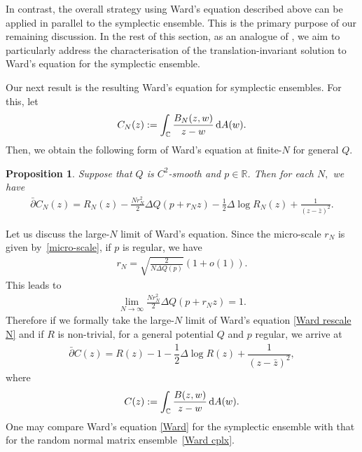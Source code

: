 \documentclass[pdftex]{sigma}
\numberwithin{equation}{section}
\newtheorem{Proposition}[Theorem]{Proposition}
 { \theoremstyle{definition}
\newtheorem{Definition}[Theorem]{Definition}
\newtheorem{Example}[Theorem]{Example}
\newtheorem{Remark}[Theorem]{Remark} }
\newcommand{\R}{{\mathbb R}}
\newcommand{\C}{{\mathbb C}}
\newcommand{\1}{\chi}
\begin{document}
\begin{Remark}
In contrast, the overall strategy using Ward's equation described above can be applied in parallel to the symplectic ensemble.
This is the primary purpose of our remaining discussion.
In the rest of this section, as an analogue of \cite{MR4030288}, we aim to particularly address the characterisation of the translation-invariant solution to Ward's equation for the symplectic ensemble.
\end{Remark}

Our next result is the resulting Ward's equation for symplectic ensembles. For this, let
\begin{gather*}
C_N(z):=\int_{ \C }\frac{B_N(z,w)}{z-w}\, {\rm d}A(w).
\end{gather*}
Then, we obtain the following form of Ward's equation at finite-$N$ for general $Q$.

\begin{Proposition} \label{Thm_Ward N}
	Suppose that $Q$ is $C^2$-smooth and $p \in \R$.
	Then for each $N,$ we have
	\begin{gather}		\label{Ward rescale N}
		\bar{\partial} C_N(z)= R_N(z) -\frac{Nr_N^2}{2} \Delta Q( p+r_N z )
		-\frac12 \Delta \log R_N(z) + \frac{ 1 }{ (z-\bar{z})^2 }.
	\end{gather}
\end{Proposition}

Let us discuss the large-$N$ limit of Ward's equation.
Since the micro-scale $r_N$ is given by~\eqref{micro-scale}, if $p$ is regular, we have
\begin{gather} \label{rN regular Lap}
r_N= \sqrt{ \frac{2}{N \Delta Q(p)} }(1+o(1)).
\end{gather}
This leads to
\begin{gather*}
\lim_{N \to \infty} \frac{Nr_N^2}{2} \Delta Q( p+r_N z )=1.
\end{gather*}
Therefore if we formally take the large-$N$ limit of Ward's equation \eqref{Ward rescale N} and if $R$ is non-trivial, for a general potential $Q$ and $p$ regular, we arrive at
\begin{gather} \label{Ward}
	\bar{\partial} C(z)=R(z)-1-\dfrac12 \Delta \log R(z)+\dfrac{1}{(z-\bar{z})^2},
\end{gather}
where
\begin{gather*}
C(z):=\int_{ \C }\frac{B(z,w)}{z-w}\, {\rm d}A(w).
\end{gather*}
One may compare Ward's equation \eqref{Ward} for the symplectic ensemble with that for the random normal matrix ensemble~\eqref{Ward cplx}.
\end{document}

